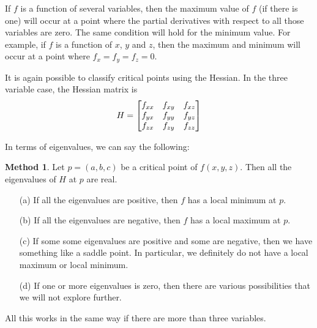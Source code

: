 \documentclass[reqno]{amsart}
\theoremstyle{definition}
\newtheorem{method}[theorem]{Method}
\begin{document}
If $f$ is a function of several variables, then the maximum value of
$f$ (if there is one) will occur at a point where the partial
derivatives with respect to all those variables are zero.  The same
condition will hold for the minimum value.  For example, if $f$ is a
function of $x$, $y$ and $z$, then the maximum and minimum will occur
at a point where $f_x=f_y=f_z=0$.  

It is again possible to classify critical points using the Hessian.
In the three variable case, the Hessian matrix is
\[ H = \left[\begin{matrix} f_{xx} & f_{xy} & f_{xz} \\
            f_{yx} & f_{yy} & f_{yz} \\
            f_{zx} & f_{zy} & f_{zz} \end{matrix}\right] 
\]

In terms of eigenvalues, we can say the following:
\begin{method}
 Let $p=(a,b,c)$ be a critical point of $f(x,y,z)$.  Then all the
 eigenvalues of $H$ at $p$ are real.  
 \begin{itemize}
  \item[(a)] If all the eigenvalues are positive, then $f$ has a local
   minimum at $p$. 
  \item[(b)] If all the eigenvalues are negative, then $f$ has a local
   maximum at $p$.
  \item[(c)] If some some eigenvalues are positive and some are
   negative, then we have something like a saddle point.  In
   particular, we definitely do not have a local maximum or local
   minimum.
  \item[(d)] If one or more eigenvalues is zero, then there are
   various possibilities that we will not explore further.
 \end{itemize}
 All this works in the same way if there are more than three
 variables. 
\end{method}
\end{document}
